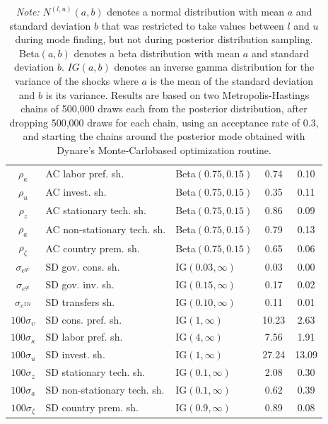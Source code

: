 \documentclass[12pt]{article}
\begin{document}
\begin{table}
\begin{footnotesize}
\begin{tabular}{c l | l c c}
    $\rho_{\kappa}$ & AC labor pref. sh. & Beta$\left(0.75,0.15\right)$ & 0.74 & 0.10 \\
    $\rho_{u}$ & AC invest. sh. & Beta$\left(0.75,0.15\right)$ & 0.35 & 0.11 \\
    $\rho_{z}$ & AC stationary tech. sh. & Beta$\left(0.75,0.15\right)$ & 0.86 & 0.09 \\
    $\rho_{a}$ & AC non-stationary tech. sh. & Beta$\left(0.75,0.15\right)$ & 0.79 & 0.13 \\
    $\rho_{\zeta}$ & AC country prem. sh. & Beta$\left(0.75,0.15\right)$ & 0.65 & 0.06 \\
    $\sigma_{e^{gc}}$ & SD gov. cons. sh. & IG$\left(0.03,\infty\right)$ & 0.03 & 0.00 \\
    $\sigma_{e^{gi}}$ & SD gov. inv. sh. & IG$\left(0.15,\infty\right)$ & 0.17 & 0.02 \\
    $\sigma_{e^{TR}}$ & SD transfers sh. & IG$\left(0.10,\infty\right)$ & 0.11 & 0.01 \\
    $100\sigma_{\upsilon}$ & SD cons. pref. sh. & IG$\left(1,\infty\right)$ & 10.23 & 2.63 \\
    $100\sigma_{\kappa}$ & SD labor pref. sh. & IG$\left(4,\infty\right)$ & 7.56 & 1.91 \\
    $100\sigma_{u}$ & SD invest. sh. & IG$\left(1,\infty\right)$ & 27.24 & 13.09 \\
    $100\sigma_{z}$ & SD stationary tech. sh. & IG$\left(0.1,\infty\right)$ & 2.08 & 0.30 \\
    $100\sigma_{a}$ & SD non-stationary tech. sh. & IG$\left(0.1,\infty\right)$ & 0.62 & 0.39 \\
    $100\sigma_{\zeta}$ & SD country prem. sh. & IG$\left(0.9,\infty\right)$ & 0.89 & 0.08 \\
    \hline
    \end{tabular}
    \caption*{\tiny{\emph{Note:} $N^{(l,u)}\left(a,b\right)$ denotes a normal distribution with mean $a$ and standard deviation $b$ that was restricted to take values between $l$ and $u$ during mode finding, but not during posterior distribution sampling. Beta$\left(a,b\right)$ denotes a beta distribution with mean $a$ and standard deviation $b$. $IG(a,b)$ denotes an inverse gamma distribution for the variance of the shocks where $a$ is the mean of the standard deviation and $b$ is its variance. Results are based on two Metropolis-Hastings chains of 500,000 draws each from the posterior distribution, after dropping 500,000 draws for each chain, using an acceptance rate of 0.3, and starting the chains around the posterior mode obtained with Dynare's Monte-Carlo\textendash based optimization routine.}}
\end{footnotesize}
\end{table}
\end{document}
